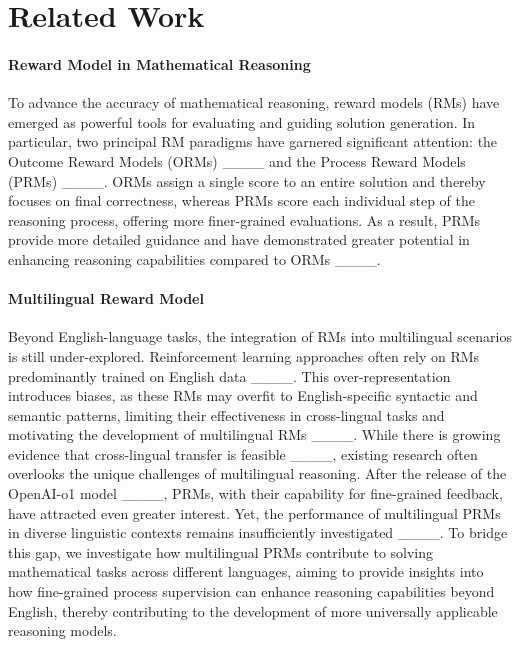 \section{Related Work}
\label{sec:related_work}

\paragraph{Reward Model in Mathematical Reasoning}

To advance the accuracy of mathematical reasoning, reward models (RMs) have emerged as powerful tools for evaluating and guiding solution generation. In particular, two principal RM paradigms have garnered significant attention: the Outcome Reward Models (ORMs) ____ and the Process Reward Models (PRMs) ____. ORMs assign a single score to an entire solution and thereby focuses on final correctness, whereas PRMs score each individual step of the reasoning process, offering more finer-grained evaluations. As a result, PRMs provide more detailed guidance and have demonstrated greater potential in enhancing reasoning capabilities compared to ORMs ____.



\paragraph{Multilingual Reward Model}

Beyond English-language tasks, the integration of RMs into multilingual scenarios is still under-explored. 
Reinforcement learning approaches often rely on RMs predominantly trained on English data ____. This over-representation introduces biases, as these RMs may overfit to English-specific syntactic and semantic patterns, limiting their effectiveness in cross-lingual tasks and motivating the development of multilingual RMs ____. While there is growing evidence that cross-lingual transfer is feasible ____, existing research often overlooks the unique challenges of multilingual reasoning.
After the release of the OpenAI-o1 model ____, PRMs, with their capability for fine-grained feedback, have attracted even greater interest. Yet, the performance of multilingual PRMs in diverse linguistic contexts remains insufficiently investigated ____. To bridge this gap, we investigate how multilingual PRMs contribute to solving mathematical tasks across different languages, aiming to provide insights into how fine-grained process supervision can enhance reasoning capabilities beyond English, thereby contributing to the development of more universally applicable reasoning models.
